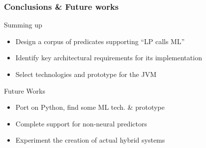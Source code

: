 \documentclass[presentation]{beamer}\mode<presentation>{\usetheme{AMSBolognaFC}}
\begin{document}
\begin{frame}%
\frametitle{Conclusions \& Future works}

\begin{block}{Summing up}
    \begin{itemize}
        \item Design a corpus of predicates supporting ``LP calls ML''
        \item Identify key architectural requirements for its implementation
        \item Select technologies and prototype for the JVM
    \end{itemize}
\end{block}

\begin{exampleblock}{Future Works}
    \begin{itemize}
        \item Port \twopkt{} on Python\footnotemark{}, find some ML tech. \& prototype
        \item Complete support for non-neural predictors
        \item Experiment the creation of actual hybrid systems
    \end{itemize}
\end{exampleblock}


\end{frame}

\section*{}
\frame{\titlepage}
\end{document}
